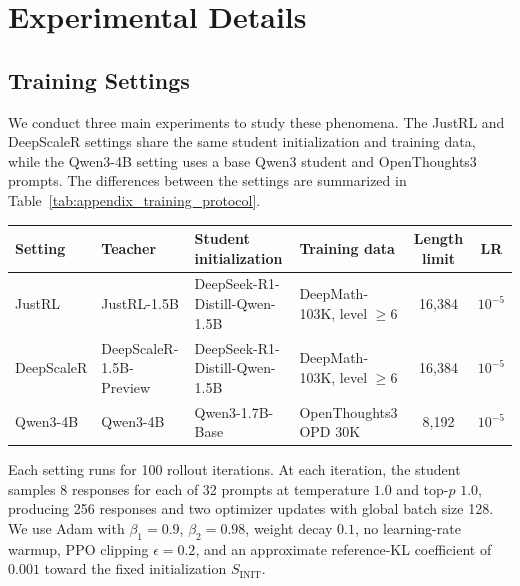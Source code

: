 
\section{Experimental Details}

\subsection{Training Settings}
\label{app:training_details}

We conduct three main experiments to study these phenomena.
The JustRL and DeepScaleR settings share the same student initialization and training data, while the Qwen3-4B
setting uses a base Qwen3 student and OpenThoughts3 prompts. The differences between the settings are summarized in Table~\ref{tab:appendix_training_protocol}.

\begin{center}
    \centering
    \small
    \setlength{\tabcolsep}{2.5pt}
    \label{tab:appendix_training_protocol}
    \begin{tabular}{@{}lp{}p{}p{}cc@{}}
        \toprule
        Setting & Teacher & Student initialization & Training data & Length limit & LR \\
        \midrule
        JustRL & JustRL-1.5B
        & DeepSeek-R1-Distill-Qwen-1.5B
        & DeepMath-103K, level $\geq 6$ & 16,384 & $10^{-5}$ \\
        DeepScaleR & DeepScaleR-1.5B-Preview
        & DeepSeek-R1-Distill-Qwen-1.5B
        & DeepMath-103K, level $\geq 6$ & 16,384 & $10^{-5}$ \\
        Qwen3-4B & Qwen3-4B
        & Qwen3-1.7B-Base
        & OpenThoughts3 OPD 30K & 8,192 & $10^{-5}$ \\
        \bottomrule
    \end{tabular}
\end{center}

Each setting runs for 100 rollout iterations.
At each iteration, the student samples 8 responses for each of 32 prompts at
temperature $1.0$ and top-$p$ $1.0$, producing 256 responses and two optimizer
updates with global batch size 128. We use Adam with $\beta_1=0.9$,
$\beta_2=0.98$, weight decay $0.1$, no learning-rate warmup, PPO clipping
$\epsilon=0.2$, and an approximate reference-KL coefficient of $0.001$ toward
the fixed initialization $S_{\mathrm{INIT}}$.

